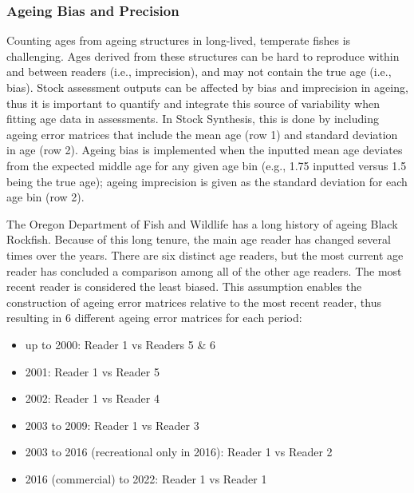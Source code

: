 \documentclass[11pt,
  letterpaper,
]{article}
\providecommand{\tightlist}{%
  \setlength{\itemsep}{0pt}\setlength{\parskip}{0pt}}
\providecommand{\tightlist}{%
  \setlength{\itemsep}{0pt}\setlength{\parskip}{0pt}}
\begin{document}
\hypertarget{ageing-bias-and-precision}{%
\subsubsection{Ageing Bias and Precision}\label{ageing-bias-and-precision}}

Counting ages from ageing structures in long-lived, temperate fishes is challenging. Ages derived from these structures can be hard to reproduce within and between readers (i.e., imprecision), and may not contain the true age (i.e., bias). Stock assessment outputs can be affected by bias and imprecision in ageing, thus it is important to quantify and integrate this source of variability when fitting age data in assessments. In Stock Synthesis, this is done by including ageing error matrices that include the mean age (row 1) and standard deviation in age (row 2). Ageing bias is implemented when the inputted mean age deviates from the expected middle age for any given age bin (e.g., 1.75 inputted versus 1.5 being the true age); ageing imprecision is given as the standard deviation for each age bin (row 2).

The Oregon Department of Fish and Wildlife has a long history of ageing Black Rockfish. Because of this long tenure, the main age reader has changed several times over the years. There are six distinct age readers, but the most current age reader has concluded a comparison among all of the other age readers. The most recent reader is considered the least biased. This assumption enables the construction of ageing error matrices relative to the most recent reader, thus resulting in 6 different ageing error matrices for each period:

\begin{itemize}
\tightlist
\item
  up to 2000: Reader 1 vs Readers 5 \& 6
\item
  2001: Reader 1 vs Reader 5
\item
  2002: Reader 1 vs Reader 4
\item
  2003 to 2009: Reader 1 vs Reader 3
\item
  2003 to 2016 (recreational only in 2016): Reader 1 vs Reader 2
\item
  2016 (commercial) to 2022: Reader 1 vs Reader 1
\end{itemize}
\end{document}
